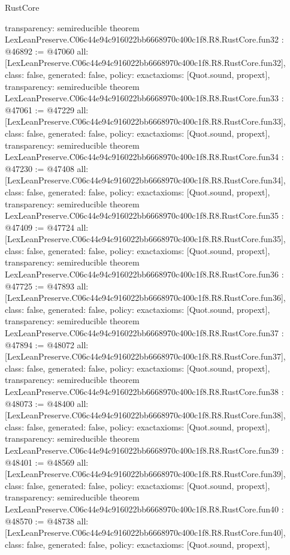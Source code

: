 \begin{lexlean}{RustCore}
\begin{coremodule}
{  transparency: semireducible
}
theorem LexLeanPreserve.C06c44e94c916022bb6668970c400c1f8.R8.RustCore.fun32 : @46892 := @47060 {
  all: [LexLeanPreserve.C06c44e94c916022bb6668970c400c1f8.R8.RustCore.fun32],
  class: false,
  generated: false,
  policy: exact{axioms: [Quot.sound, propext]},
  transparency: semireducible
}
theorem LexLeanPreserve.C06c44e94c916022bb6668970c400c1f8.R8.RustCore.fun33 : @47061 := @47229 {
  all: [LexLeanPreserve.C06c44e94c916022bb6668970c400c1f8.R8.RustCore.fun33],
  class: false,
  generated: false,
  policy: exact{axioms: [Quot.sound, propext]},
  transparency: semireducible
}
theorem LexLeanPreserve.C06c44e94c916022bb6668970c400c1f8.R8.RustCore.fun34 : @47230 := @47408 {
  all: [LexLeanPreserve.C06c44e94c916022bb6668970c400c1f8.R8.RustCore.fun34],
  class: false,
  generated: false,
  policy: exact{axioms: [Quot.sound, propext]},
  transparency: semireducible
}
theorem LexLeanPreserve.C06c44e94c916022bb6668970c400c1f8.R8.RustCore.fun35 : @47409 := @47724 {
  all: [LexLeanPreserve.C06c44e94c916022bb6668970c400c1f8.R8.RustCore.fun35],
  class: false,
  generated: false,
  policy: exact{axioms: [Quot.sound, propext]},
  transparency: semireducible
}
theorem LexLeanPreserve.C06c44e94c916022bb6668970c400c1f8.R8.RustCore.fun36 : @47725 := @47893 {
  all: [LexLeanPreserve.C06c44e94c916022bb6668970c400c1f8.R8.RustCore.fun36],
  class: false,
  generated: false,
  policy: exact{axioms: [Quot.sound, propext]},
  transparency: semireducible
}
theorem LexLeanPreserve.C06c44e94c916022bb6668970c400c1f8.R8.RustCore.fun37 : @47894 := @48072 {
  all: [LexLeanPreserve.C06c44e94c916022bb6668970c400c1f8.R8.RustCore.fun37],
  class: false,
  generated: false,
  policy: exact{axioms: [Quot.sound, propext]},
  transparency: semireducible
}
theorem LexLeanPreserve.C06c44e94c916022bb6668970c400c1f8.R8.RustCore.fun38 : @48073 := @48400 {
  all: [LexLeanPreserve.C06c44e94c916022bb6668970c400c1f8.R8.RustCore.fun38],
  class: false,
  generated: false,
  policy: exact{axioms: [Quot.sound, propext]},
  transparency: semireducible
}
theorem LexLeanPreserve.C06c44e94c916022bb6668970c400c1f8.R8.RustCore.fun39 : @48401 := @48569 {
  all: [LexLeanPreserve.C06c44e94c916022bb6668970c400c1f8.R8.RustCore.fun39],
  class: false,
  generated: false,
  policy: exact{axioms: [Quot.sound, propext]},
  transparency: semireducible
}
theorem LexLeanPreserve.C06c44e94c916022bb6668970c400c1f8.R8.RustCore.fun40 : @48570 := @48738 {
  all: [LexLeanPreserve.C06c44e94c916022bb6668970c400c1f8.R8.RustCore.fun40],
  class: false,
  generated: false,
  policy: exact{axioms: [Quot.sound, propext]},
}
\end{coremodule}
\end{lexlean}
